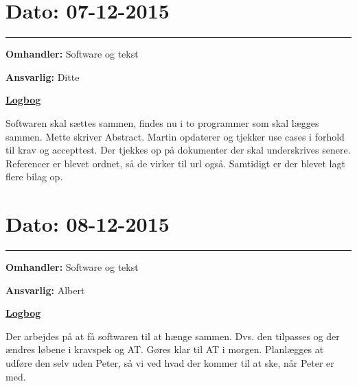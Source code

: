\section{Dato: 07-12-2015}
\hrule
\textbf{Omhandler:} Software og tekst

\textbf{Ansvarlig:} Ditte 

\underline{\textbf{Logbog}}

Softwaren skal sættes sammen, findes nu i to programmer som skal lægges sammen. 
Mette skriver Abstract. 
Martin opdaterer og tjekker use cases i forhold til krav og accepttest. Der tjekkes op på dokumenter der skal underskrives senere. \\Referencer er blevet ordnet, så de virker til url også. Samtidigt er der blevet lagt flere bilag op.  
\\

\section{Dato: 08-12-2015}
\hrule
\textbf{Omhandler:} Software og tekst

\textbf{Ansvarlig:} Albert 

\underline{\textbf{Logbog}}

Der arbejdes på at få softwaren til at hænge sammen. Dvs. den tilpasses og der ændres løbene i kravspek og AT. Gøres klar til AT i morgen. Planlægges at udføre den selv uden Peter, så vi ved hvad der kommer til at ske, når Peter er med.   
\\